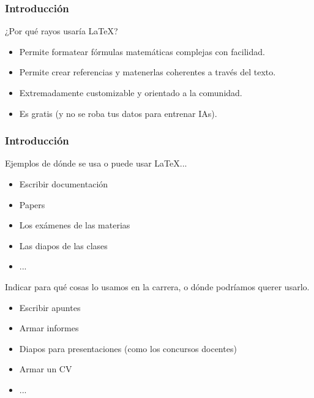 \begin{frame}
    \frametitle{Introducción}
    \begin{tcolorbox}[colframe=color1]
        \begin{center}
            ¿Por qué rayos usaría \LaTeX ?
        \end{center}
    \end{tcolorbox}

    \begin{itemize}
        \item Permite formatear fórmulas matemáticas complejas con facilidad.
        \item Permite crear referencias y matenerlas coherentes a través del texto.
        \item Extremadamente customizable y orientado a la comunidad.
        \item Es gratis (y no se roba tus datos para entrenar IAs).
    \end{itemize}
\end{frame}

\begin{frame}
\frametitle{Introducción}
    Ejemplos de dónde se usa o puede usar \LaTeX ...
    \begin{itemize}
    \item Escribir documentación
    \item Papers
    \item Los exámenes de las materias
    \item Las diapos de las clases
    \item ...
    \end{itemize}
    Indicar para qué cosas lo usamos en la carrera, o dónde podríamos querer usarlo.
    \begin{itemize}
    \item Escribir apuntes
    \item Armar informes
    \item Diapos para presentaciones (como los concursos docentes)
    \item Armar un CV
    \item ...
    \end{itemize}
\end{frame}
